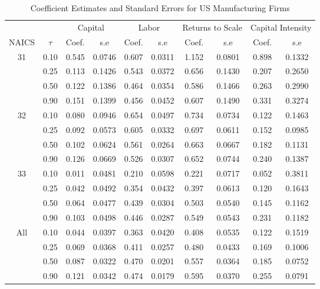 \begin{table}[ht]
\centering
\caption{Coefficient Estimates and Standard Errors for US Manufacturing Firms} 
\begin{tabular}{cccccccccc}
  \hline\hline & & \multicolumn{2}{c}{Capital}  & \multicolumn{2}{c}{Labor} & \multicolumn{2}{c}{Returns to Scale} & \multicolumn{2}{c}{Capital Intensity}\\ \cmidrule(lr){3-4} \cmidrule(lr){5-6} \cmidrule(lr){7-8} \cmidrule(lr){9-10}NAICS & $\tau$ & Coef. & s.e & Coef. & s.e & Coef. & s.e & Coef. & s.e \\ 
  \hline
31 & 0.10 & 0.545 & 0.0746 & 0.607 & 0.0311 & 1.152 & 0.0801 & 0.898 & 0.1332 \\ 
   & 0.25 & 0.113 & 0.1426 & 0.543 & 0.0372 & 0.656 & 0.1430 & 0.207 & 0.2650 \\ 
   & 0.50 & 0.122 & 0.1386 & 0.464 & 0.0354 & 0.586 & 0.1466 & 0.263 & 0.2990 \\ 
   & 0.90 & 0.151 & 0.1399 & 0.456 & 0.0452 & 0.607 & 0.1490 & 0.331 & 0.3274 \\ 
  32 & 0.10 & 0.080 & 0.0946 & 0.654 & 0.0497 & 0.734 & 0.0734 & 0.122 & 0.1463 \\ 
   & 0.25 & 0.092 & 0.0573 & 0.605 & 0.0332 & 0.697 & 0.0611 & 0.152 & 0.0985 \\ 
   & 0.50 & 0.102 & 0.0624 & 0.561 & 0.0264 & 0.663 & 0.0667 & 0.182 & 0.1131 \\ 
   & 0.90 & 0.126 & 0.0669 & 0.526 & 0.0307 & 0.652 & 0.0744 & 0.240 & 0.1387 \\ 
  33 & 0.10 & 0.011 & 0.0481 & 0.210 & 0.0598 & 0.221 & 0.0717 & 0.052 & 0.3811 \\ 
   & 0.25 & 0.042 & 0.0492 & 0.354 & 0.0432 & 0.397 & 0.0613 & 0.120 & 0.1643 \\ 
   & 0.50 & 0.064 & 0.0477 & 0.439 & 0.0304 & 0.503 & 0.0540 & 0.145 & 0.1162 \\ 
   & 0.90 & 0.103 & 0.0498 & 0.446 & 0.0287 & 0.549 & 0.0543 & 0.231 & 0.1182 \\ 
  All & 0.10 & 0.044 & 0.0397 & 0.363 & 0.0420 & 0.408 & 0.0535 & 0.122 & 0.1519 \\ 
   & 0.25 & 0.069 & 0.0368 & 0.411 & 0.0257 & 0.480 & 0.0433 & 0.169 & 0.1006 \\ 
   & 0.50 & 0.087 & 0.0322 & 0.470 & 0.0201 & 0.557 & 0.0364 & 0.185 & 0.0752 \\ 
   & 0.90 & 0.121 & 0.0342 & 0.474 & 0.0179 & 0.595 & 0.0370 & 0.255 & 0.0791 \\ 
   \hline
\end{tabular}
\end{table}
